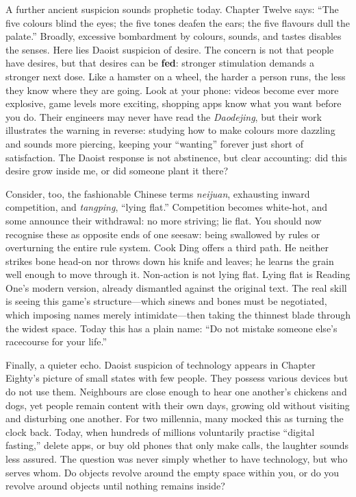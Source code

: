 A further ancient suspicion sounds prophetic today. Chapter Twelve says: ``The five colours blind the eyes; the five tones deafen the ears; the five flavours dull the palate.'' Broadly, excessive bombardment by colours, sounds, and tastes disables the senses. Here lies Daoist suspicion of desire. The concern is not that people have desires, but that desires can be \textbf{fed}: stronger stimulation demands a stronger next dose. Like a hamster on a wheel, the harder a person runs, the less they know where they are going. Look at your phone: videos become ever more explosive, game levels more exciting, shopping apps know what you want before you do. Their engineers may never have read the \textit{Daodejing}, but their work illustrates the warning in reverse: studying how to make colours more dazzling and sounds more piercing, keeping your ``wanting'' forever just short of satisfaction. The Daoist response is not abstinence, but clear accounting: did this desire grow inside me, or did someone plant it there?

Consider, too, the fashionable Chinese terms \textit{neijuan}, exhausting inward competition, and \textit{tangping}, ``lying flat.'' Competition becomes white-hot, and some announce their withdrawal: no more striving; lie flat. You should now recognise these as opposite ends of one seesaw: being swallowed by rules or overturning the entire rule system. Cook Ding offers a third path. He neither strikes bone head-on nor throws down his knife and leaves; he learns the grain well enough to move through it. Non-action is not lying flat. Lying flat is Reading One's modern version, already dismantled against the original text. The real skill is seeing this game's structure---which sinews and bones must be negotiated, which imposing names merely intimidate---then taking the thinnest blade through the widest space. Today this has a plain name: ``Do not mistake someone else's racecourse for your life.''

Finally, a quieter echo. Daoist suspicion of technology appears in Chapter Eighty's picture of small states with few people. They possess various devices but do not use them. Neighbours are close enough to hear one another's chickens and dogs, yet people remain content with their own days, growing old without visiting and disturbing one another. For two millennia, many mocked this as turning the clock back. Today, when hundreds of millions voluntarily practise ``digital fasting,'' delete apps, or buy old phones that only make calls, the laughter sounds less assured. The question was never simply whether to have technology, but who serves whom. Do objects revolve around the empty space within you, or do you revolve around objects until nothing remains inside?

